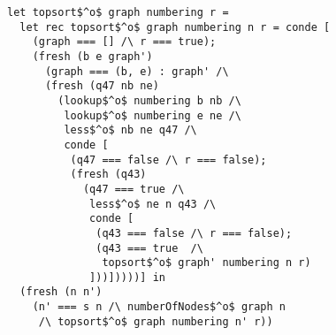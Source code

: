 \begin{figure}[!t]
  \centering
  \begin{minipage}{0.49\textwidth}
    \begin{lstlisting}[label={topsort_rel}, caption={Relational intepreter for topologic sort of a graph}, captionpos=b, frame=tb]
let topsort$^o$ graph numbering r =
  let rec topsort$^o$ graph numbering n r = conde [
    (graph === [] /\ r === true);
    (fresh (b e graph')
      (graph === (b, e) : graph' /\
      (fresh (q47 nb ne)
        (lookup$^o$ numbering b nb /\
         lookup$^o$ numbering e ne /\
         less$^o$ nb ne q47 /\
         conde [
          (q47 === false /\ r === false);
          (fresh (q43)
            (q47 === true /\
             less$^o$ ne n q43 /\
             conde [
              (q43 === false /\ r === false);
              (q43 === true  /\
               topsort$^o$ graph' numbering n r)
             ]))]))))] in
  (fresh (n n')
    (n' === s n /\ numberOfNodes$^o$ graph n
     /\ topsort$^o$ graph numbering n' r))
    \end{lstlisting}
  \end{minipage}
\end{figure}
